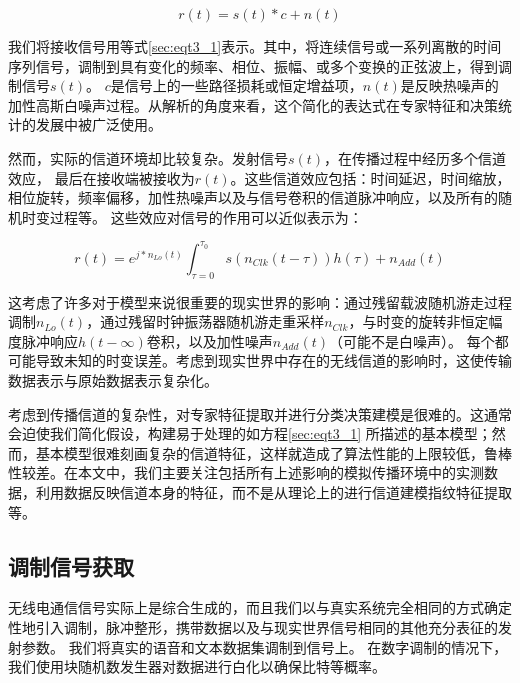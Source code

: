 \begin{equation}\label{sec:eqt3_1}
r(t) = s(t)*c + n(t)
\end{equation}

我们将接收信号用等式\ref{sec:eqt3_1}表示。其中，将连续信号或一系列离散的时间序列信号，调制到具有变化的频率、相位、振幅、或多个变换的正弦波上，得到调制信号$s(t)$。
 $c$是信号上的一些路径损耗或恒定增益项，$n(t)$是反映热噪声的加性高斯白噪声过程。从解析的角度来看，这个简化的表达式在专家特征和决策统计的发展中被广泛使用。\par

然而，实际的信道环境却比较复杂。发射信号$s(t)$，在传播过程中经历多个信道效应， 最后在接收端被接收为$r(t)$。这些信道效应包括：时间延迟，时间缩放，相位旋转，频率偏移，加性热噪声以及与信号卷积的信道脉冲响应，以及所有的随机时变过程等。 这些效应对信号的作用可以近似表示为：\par

\begin{equation}\label{sec:eqt3_2}
	r(t) = e^{j*n_{Lo}(t)} \int_{\tau=0}^{\tau_{0}} s(n_{Clk}(t-\tau))h(\tau) + n_{Add}(t)
\end{equation}

这考虑了许多对于模型来说很重要的现实世界的影响：通过残留载波随机游走过程调制$n_{Lo}(t)$，通过残留时钟振荡器随机游走重采样$n_{Clk}$，与时变的旋转非恒定幅度脉冲响应$h(t-∞)$卷积，以及加性噪声$n_{Add}(t)$（可能不是白噪声）。 每个都可能导致未知的时变误差。考虑到现实世界中存在的无线信道的影响时，这使传输数据表示与原始数据表示复杂化。\par

考虑到传播信道的复杂性，对专家特征提取并进行分类决策建模是很难的。这通常会迫使我们简化假设，构建易于处理的如方程\ref{sec:eqt3_1} 所描述的基本模型；然而，基本模型很难刻画复杂的信道特征，这样就造成了算法性能的上限较低，鲁棒性较差。在本文中，我们主要关注包括所有上述影响的模拟传播环境中的实测数据，利用数据反映信道本身的特征，而不是从理论上的进行信道建模指纹特征提取等。\par

\subsection{调制信号获取}

无线电通信信号实际上是综合生成的，而且我们以与真实系统完全相同的方式确定性地引入调制，脉冲整形，携带数据以及与现实世界信号相同的其他充分表征的发射参数。 我们将真实的语音和文本数据集调制到信号上。 在数字调制的情况下，我们使用块随机数发生器对数据进行白化以确保比特等概率。\par

